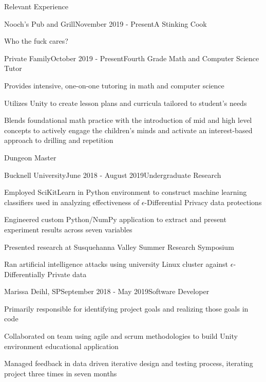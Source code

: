 \documentclass{resume} %
\begin{document}
\begin{rSection}{Relevant Experience}


\begin{rWorkSubsection}{Nooch's Pub and Grill}{November 2019 - Present}{A Stinking Cook}{}
\item Who the fuck cares?
\end{rWorkSubsection}


\begin{rWorkSubsection}{Private Family}{October 2019 - Present}{Fourth Grade Math and Computer Science Tutor}{}
\item Provides intensive, one-on-one tutoring in math and computer science
\item Utilizes Unity to create lesson plans and curricula tailored to student's needs  
\item Blends foundational math practice with the introduction of mid and high level concepts to actively engage the children's minds and activate an interest-based approach to drilling and repetition
\item Dungeon Master
\end{rWorkSubsection}


\begin{rWorkSubsection}{Bucknell University}{June 2018 - August 2019}{Undergraduate Research}{}
\item Employed SciKitLearn in Python environment to construct machine learning classifiers used in analyzing effectiveness of $\epsilon$-Differential Privacy data protections
\item Engineered custom Python/NumPy application to extract and present experiment results across seven variables
\item Presented research at Susquehanna Valley Summer Research Symposium
\item Ran artificial intelligence attacks using university Linux cluster against $\epsilon$-Differentially Private data
\end{rWorkSubsection}


\begin{rWorkSubsection}{Marissa Deihl, SP}{September 2018 - May 2019}{Software Developer}{}
\item Primarily responsible for identifying project goals and realizing those goals in code
\item Collaborated on team using agile and scrum methodologies to build Unity environment educational application
\item Managed feedback in data driven iterative design and testing process, iterating project three times in seven months
\end{rWorkSubsection}


\end{rSection}
\end{document}
